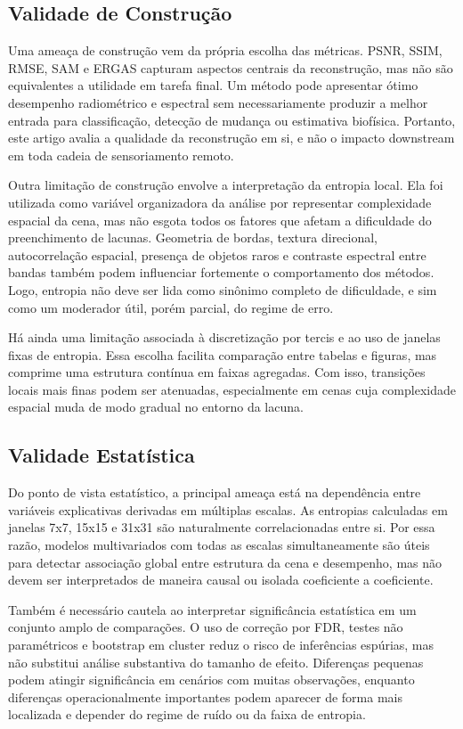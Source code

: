 \subsection{Validade de Construção}

Uma ameaça de construção vem da própria escolha das métricas.
\gls{PSNR}, \gls{SSIM}, \gls{RMSE}, \gls{SAM} e \gls{ERGAS} capturam aspectos centrais da reconstrução, mas não são equivalentes a utilidade em tarefa final.
Um método pode apresentar ótimo desempenho radiométrico e espectral sem necessariamente produzir a melhor entrada para classificação, detecção de mudança ou estimativa biofísica.
Portanto, este artigo avalia a qualidade da reconstrução em si, e não o impacto downstream em toda cadeia de sensoriamento remoto.

Outra limitação de construção envolve a interpretação da entropia local.
Ela foi utilizada como variável organizadora da análise por representar complexidade espacial da cena, mas não esgota todos os fatores que afetam a dificuldade do preenchimento de lacunas.
Geometria de bordas, textura direcional, autocorrelação espacial, presença de objetos raros e contraste espectral entre bandas também podem influenciar fortemente o comportamento dos métodos.
Logo, entropia não deve ser lida como sinônimo completo de dificuldade, e sim como um moderador útil, porém parcial, do regime de erro.

Há ainda uma limitação associada à discretização por tercis e ao uso de janelas fixas de entropia.
Essa escolha facilita comparação entre tabelas e figuras, mas comprime uma estrutura contínua em faixas agregadas.
Com isso, transições locais mais finas podem ser atenuadas, especialmente em cenas cuja complexidade espacial muda de modo gradual no entorno da lacuna.

\subsection{Validade Estatística}

Do ponto de vista estatístico, a principal ameaça está na dependência entre variáveis explicativas derivadas em múltiplas escalas.
As entropias calculadas em janelas 7x7, 15x15 e 31x31 são naturalmente correlacionadas entre si.
Por essa razão, modelos multivariados com todas as escalas simultaneamente são úteis para detectar associação global entre estrutura da cena e desempenho, mas não devem ser interpretados de maneira causal ou isolada coeficiente a coeficiente.

Também é necessário cautela ao interpretar significância estatística em um conjunto amplo de comparações.
O uso de correção por \gls{FDR}, testes não paramétricos e bootstrap em cluster reduz o risco de inferências espúrias, mas não substitui análise substantiva do tamanho de efeito.
Diferenças pequenas podem atingir significância em cenários com muitas observações, enquanto diferenças operacionalmente importantes podem aparecer de forma mais localizada e depender do regime de ruído ou da faixa de entropia.

